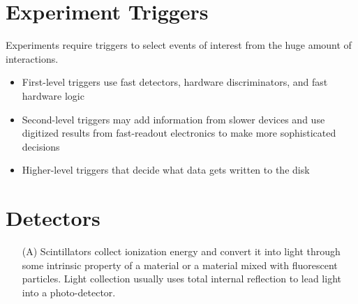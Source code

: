 \documentclass[a4paper,twoside,master.tex]{subfiles}
\begin{document}
\section{Experiment Triggers}
\label{sec:experiment_triggers}

Experiments require triggers to select events of interest from the huge amount of interactions.
\begin{itemize}
    \item First-level triggers use fast detectors, hardware discriminators, and fast hardware logic
    \item Second-level triggers may add information from slower devices and use digitized results from fast-readout electronics to make more sophisticated decisions
    \item Higher-level triggers that decide what data gets written to the disk
\end{itemize}

\section{Detectors}
\label{sec:detectors}

\begin{itemize}
    \item[(A)] Scintillators collect ionization energy and convert it into light through some intrinsic property of a material or a material mixed with fluorescent particles.
        \subitem Light collection usually uses total internal reflection to lead light into a photo-detector.
\end{itemize}
\end{document}
